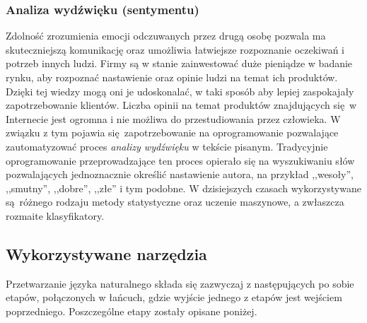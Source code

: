 \documentclass[a4paper, twoside, 12pt]{report}
\begin{document}
            \subsubsection{Analiza wydźwięku (sentymentu)}
                Zdolność zrozumienia emocji odczuwanych przez drugą osobę pozwala ma skuteczniejszą komunikację oraz
                umożliwia łatwiejsze rozpoznanie oczekiwań i potrzeb innych ludzi. Firmy są w stanie zainwestować duże
                pieniądze w badanie rynku, aby rozpoznać nastawienie oraz opinie ludzi na temat ich produktów. Dzięki
                tej wiedzy mogą oni je udoskonalać, w taki sposób aby lepiej zaspokajały zapotrzebowanie klientów.
                Liczba opinii na temat produktów znajdujących się w Internecie jest ogromna i nie możliwa do
                przestudiowania przez człowieka. W związku z tym pojawia się zapotrzebowanie na oprogramowanie pozwalające
                zautomatyzować proces \emph{analizy wydźwięku} w tekście pisanym. Tradycyjnie oprogramowanie
                przeprowadzające ten proces opierało się na wyszukiwaniu słów pozwalających jednoznacznie określić
                nastawienie autora, na przykład ,,wesoły'', ,,smutny'', ,,dobre'', ,,złe'' i tym podobne. W dzisiejszych
                czasach wykorzystywane są różnego rodzaju metody statystyczne oraz uczenie maszynowe, a zwłaszcza rozmaite
                klasyfikatory\cite{SENTIMENTANALYSIS}.

        \subsection{Wykorzystywane narzędzia}
            Przetwarzanie języka naturalnego składa się zazwyczaj z następujących po sobie etapów, połączonych w łańcuch,
            gdzie wyjście jednego z etapów jest wejściem poprzedniego. Poszczególne etapy zostały opisane poniżej.
\end{document}
